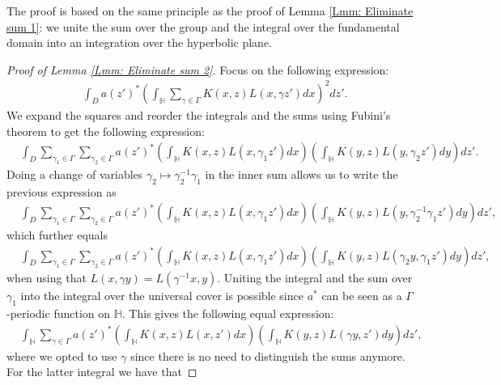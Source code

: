 \documentclass[11pt,twoside,reqno]{amsart} \usepackage{a4wide} \usepackage[T1]{fontenc} \usepackage[utf8]{inputenc} \usepackage{soul}  \usepackage{amsmath} \usepackage{amsfonts} \usepackage{amssymb} \usepackage{mathtools} \usepackage{amsthm} \usepackage{xcolor} \usepackage{graphicx} \usepackage{hyperref} \usepackage{standalone} \usepackage{esint} \usepackage{comment} \usepackage[left=2.3cm,top=3cm,right=2.3cm]{geometry} \usepackage{bm} \usepackage{svg} \usepackage{float} \numberwithin{equation}{section} \theoremstyle{plain} \newtheorem{thm}{Theorem}[section] \newtheorem{theorem}[thm]{Theorem} \newtheorem*{theorem*}{Theorem}\newtheorem{conj}[thm]{Conjecture} \newtheorem{lemma}[thm]{Lemma} \newtheorem{prop}[thm]{Proposition} \newtheorem{proposition}[thm]{Proposition} \newtheorem{cor}[thm]{Corollary} \newtheorem{question}[thm]{Question} \newtheorem{corollary}[thm]{Corollary} \newtheorem{assumption}[thm]{Assumption} \theoremstyle{definition} \newtheorem{defn}[thm]{Definition} \newtheorem{choice}[thm]{Choice} \newtheorem{definition}[thm]{Definition} \newtheorem{ex}[thm]{Example} \newtheorem{notation}[thm]{Notation} \newtheorem*{ack}{Acknowledgements} \theoremstyle{remark} \newtheorem{remark}[thm]{Remark} \newtheorem{bigremark}[thm]{Remark} \usepackage{xcolor} \newcommand{\red}[1]{ {\color{Red}#1} } \newcommand{\blue}[1]{ {\color{Blue}#1} } \author{Kai Hippi} \address{Aalto University, Espoo, Finland} \email{kai.hippi@aalto.fi}
\begin{document}
The proof is based on the same principle as the proof of Lemma \ref{Lmm: Eliminate sum 1}: we unite the sum over the group and the integral over the fundamental domain into an integration over the hyperbolic plane.

\begin{proof}[Proof of Lemma \ref{Lmm: Eliminate sum 2}]
	Focus on the following expression:
	\begin{align*}
		&
		\int_{D} a( z' )^{*} \left( \int_{\mathbb{H}} \sum_{\gamma \in \Gamma}^{} K( x,z ) L( x, \gamma z' ) dx \right)^{2}  dz'.
	\end{align*}
	We expand the squares and reorder the integrals and the sums using Fubini's theorem to get the following expression:
	\begin{align*}
		&
		\int_{D} \sum_{\gamma_{1} \in \Gamma}^{} \sum_{\gamma_{2} \in \Gamma}^{} a( z' )^{*} \left( \int_{\mathbb{H}} K( x, z ) L( x, \gamma_{1} z' ) dx \right) \left( \int_{\mathbb{H}} K( y, z ) L( y, \gamma_{2} z' ) dy \right) dz'.
	\end{align*}
	Doing a change of variables $ \gamma_{2} \mapsto \gamma_{2}^{-1} \gamma_{1} $ in the inner sum allows us to write the previous expression as
	\begin{align*}
		&
		\int_{D} \sum_{\gamma_{1} \in \Gamma}^{} \sum_{\gamma_{2} \in \Gamma}^{} a( z' )^{*} \left( \int_{\mathbb{H}} K( x, z ) L( x, \gamma_{1} z' ) dx \right) \left( \int_{\mathbb{H}} K( y, z ) L( y, \gamma_{2}^{-1} \gamma_{1} z' ) dy \right) dz',
	\end{align*}
	which further equals
	\begin{align*}
		&
		\int_{D} \sum_{\gamma_{1} \in \Gamma}^{} \sum_{\gamma_{2} \in \Gamma}^{} a( z' )^{*} \left( \int_{\mathbb{H}} K( x, z ) L( x, \gamma_{1} z' ) dx \right) \left( \int_{\mathbb{H}} K( y, z ) L( \gamma_{2} y, \gamma_{1} z' ) dy \right) dz',
	\end{align*}
	when using that $ L( x, \gamma y ) = L( \gamma^{-1} x, y  ) $. Uniting the integral and the sum over $ \gamma_{1} $ into the integral over the universal cover is possible since $ a^{*} $ can be seen as a $ \Gamma $-periodic function on $ \mathbb{H} $. This gives the following equal expression:
	\begin{align}
		&
		\label{Expr: One sum left}
		\int_{\mathbb{H}} \sum_{\gamma \in \Gamma}^{} a( z' )^{*} \left( \int_{\mathbb{H}} K( x,z ) L( x, z' ) dx \right) \left( \int_{\mathbb{H}} K( y,z ) L( \gamma y, z' ) dy \right) dz',	
	\end{align}
	where we opted to use $ \gamma $ since there is no need to distinguish the sums anymore. For the latter integral we have that

\end{proof}
\end{document}
